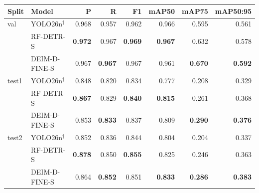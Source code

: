 \begin{tabular}{llrrrrrr}
\toprule
Split & Model & P & R & F1 & mAP50 & mAP75 & mAP50:95 \\
\midrule
val & YOLO26n$^\dagger$ & 0.968 & 0.957 & 0.962 & 0.966 & 0.595 & 0.561 \\
 & RF-DETR-S & \textbf{0.972} & 0.967 & \textbf{0.969} & \textbf{0.967} & 0.632 & 0.578 \\
 & DEIM-D-FINE-S & 0.967 & \textbf{0.967} & 0.967 & 0.961 & \textbf{0.670} & \textbf{0.592} \\
\midrule
test1 & YOLO26n$^\dagger$ & 0.848 & 0.820 & 0.834 & 0.777 & 0.208 & 0.329 \\
 & RF-DETR-S & \textbf{0.867} & 0.829 & \textbf{0.840} & \textbf{0.815} & 0.261 & 0.368 \\
 & DEIM-D-FINE-S & 0.853 & \textbf{0.833} & 0.837 & 0.809 & \textbf{0.290} & \textbf{0.376} \\
\midrule
test2 & YOLO26n$^\dagger$ & 0.852 & 0.836 & 0.844 & 0.804 & 0.204 & 0.337 \\
 & RF-DETR-S & \textbf{0.878} & 0.850 & \textbf{0.855} & 0.825 & 0.246 & 0.363 \\
 & DEIM-D-FINE-S & 0.864 & \textbf{0.852} & 0.851 & \textbf{0.833} & \textbf{0.286} & \textbf{0.383} \\
\bottomrule
\end{tabular}
